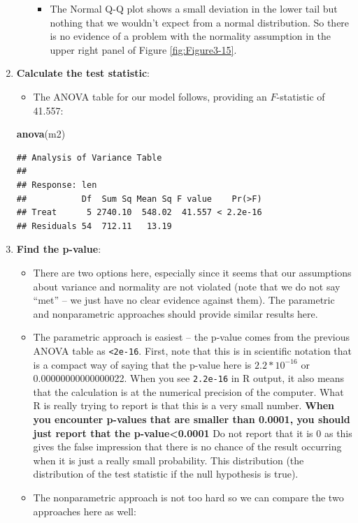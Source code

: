 \documentclass[]{book}
\newenvironment{Shaded}{\begin{snugshade}}{\end{snugshade}}
\newcommand{\KeywordTok}[1]{\textcolor[rgb]{0.13,0.29,0.53}{\textbf{#1}}}
\newcommand{\NormalTok}[1]{#1}
\providecommand{\tightlist}{%
  \setlength{\itemsep}{0pt}\setlength{\parskip}{0pt}}
\theoremstyle{definition}
\theoremstyle{definition}
\theoremstyle{remark}
\begin{document}
\begin{enumerate}
\begin{itemize}
    \begin{itemize}
    \tightlist
    \item
      The Normal Q-Q plot shows a small deviation in the lower tail but
      nothing that we wouldn't expect from a normal distribution. So
      there is no evidence of a problem with the normality assumption in
      the upper right panel of Figure \ref{fig:Figure3-15}.
    \end{itemize}
  \end{itemize}
\item
  \textbf{Calculate the test statistic}:

  \begin{itemize}
  \tightlist
  \item
    The ANOVA table for our model follows, providing an \(F\)-statistic
    of 41.557:
  \end{itemize}

\begin{Shaded}
\begin{Highlighting}[]
\KeywordTok{anova}\NormalTok{(m2)}
\end{Highlighting}
\end{Shaded}

\begin{verbatim}
## Analysis of Variance Table
## 
## Response: len
##           Df  Sum Sq Mean Sq F value    Pr(>F)
## Treat      5 2740.10  548.02  41.557 < 2.2e-16
## Residuals 54  712.11   13.19
\end{verbatim}
\item
  \textbf{Find the p-value}:

  \begin{itemize}
  \item
    There are two options here, especially since it seems that our
    assumptions about variance and normality are not violated (note that
    we do not say ``met'' -- we just have no clear evidence against
    them). The parametric and nonparametric approaches should provide
    similar results here.
  \item
    The parametric approach is easiest -- the p-value comes from the
    previous ANOVA table as \texttt{\textless{}2e-16}. First, note that
    this is in scientific notation that is a compact way of saying that
    the p-value here is \(2.2*10^{-16}\) or 0.00000000000000022. When
    you see \texttt{2.2e-16} in R output, it also means that the
    calculation is at the numerical precision of the computer. What R is
    really trying to report is that this is a very small number.
    \textbf{When you encounter p-values that are smaller than 0.0001,
    you should just report that the p-value\textless{}0.0001} Do not
    report that it is 0 as this gives the false impression that there is
    no chance of the result occurring when it is just a really small
    probability. This distribution (the distribution of the test
    statistic if the null hypothesis is true).
  \item
    The nonparametric approach is not too hard so we can compare the two
    approaches here as well:
  \end{itemize}


\end{enumerate}
\end{document}
